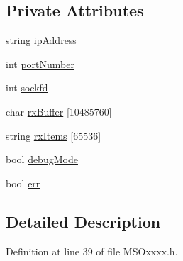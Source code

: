 \subsection*{Private Attributes}
\begin{DoxyCompactItemize}
\item 
string \hyperlink{classMSOxxxx_aa55bdb0feb799b195628fe6ef0222b62}{ipAddress}
\item 
int \hyperlink{classMSOxxxx_a242bcf72c701cd20d86d25315fc6180f}{portNumber}
\item 
int \hyperlink{classMSOxxxx_acf030a8f1ddd78d632816c856f50455c}{sockfd}
\item 
char \hyperlink{classMSOxxxx_a1a50770759caada18087ca8ffb96f357}{rxBuffer} \mbox{[}10485760\mbox{]}
\item 
string \hyperlink{classMSOxxxx_a847cae37181e9ec5f481edcc3fb19b1a}{rxItems} \mbox{[}65536\mbox{]}
\item 
bool \hyperlink{classMSOxxxx_a826ba82e93bbe5780169107a31dbfd29}{debugMode}
\item 
bool \hyperlink{classMSOxxxx_af0af7ac8123ee93917d0e92ec947acaa}{err}
\end{DoxyCompactItemize}


\subsection{Detailed Description}


Definition at line 39 of file MSOxxxx.h.

